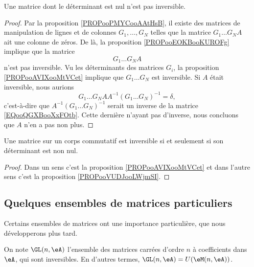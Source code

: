\begin{proposition}     \label{PROPooVUDJooLWjmSI}
    Une matrice dont le déterminant est nul n'est pas inversible.
\end{proposition}

\begin{proof}
    Par la proposition \ref{PROPooPMYCooAAtHsB}, il existe des matrices de manipulation de lignes et de colonnes \( G_1,\ldots, G_N\) telles que la matrice \( G_1\ldots G_NA\) ait une colonne de zéros. De là, la proposition \ref{PROPooEOKBooKUROFg} implique que la matrice
    \begin{equation}        \label{EQooQGXBooXxFOtb}
        G_1\ldots G_NA
    \end{equation}
    n'est pas inversible. Vu les déterminants des matrices \( G_i\),  la proposition \ref{PROPooAVIXooMtVCet} implique que \( G_1\ldots G_N\) est inversible. Si \( A\) était inversible, nous aurions
    \begin{equation}
        G_1\dots G_NAA^{-1}(G_1\ldots G_N)^{-1}=\delta,
    \end{equation}
    c'est-à-dire que \( A^{-1}(G_1\ldots G_N)^{-1}\) serait un inverse de la matrice \eqref{EQooQGXBooXxFOtb}. Cette dernière n'ayant pas d'inverse, nous concluons que \( A\) n'en a pas non plus.
\end{proof}

\begin{theorem}     \label{THOooSNXWooSRjleb}
    Une matrice sur un corps commutatif est inversible si et seulement si son déterminant est non nul.
\end{theorem}

\begin{proof}
    Dans un sens c'est la proposition \ref{PROPooAVIXooMtVCet} et dans l'autre sens c'est la proposition \ref{PROPooVUDJooLWjmSI}.
\end{proof}

\subsection{Quelques ensembles de matrices particuliers}
Certains ensembles de matrices ont une importance particulière, que nous développerons plus tard.

\begin{definition}
On note \( \GL(n,\eA) \) l'ensemble des matrices carrées d'ordre \( n \) à coefficients dans \( \eA \), qui sont inversibles. En d'autres termes, \( \GL(n,\eA) = U (\eM (n,\eA) ) \).
\end{definition}

